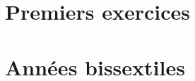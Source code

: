 

\usepackage{parcolumns}
\setlength{\parindent}{0pt}

 
\section{Premiers exercices}


\section{Années bissextiles}


